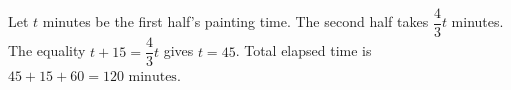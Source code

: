 Let $t$ minutes be the first half's painting time. The second half takes $\dfrac{4}{3}t$ minutes. The equality $t+15=\dfrac{4}{3}t$ gives $t=45$. Total elapsed time is $45+15+60=\boxed{120\text{ minutes}}$.
